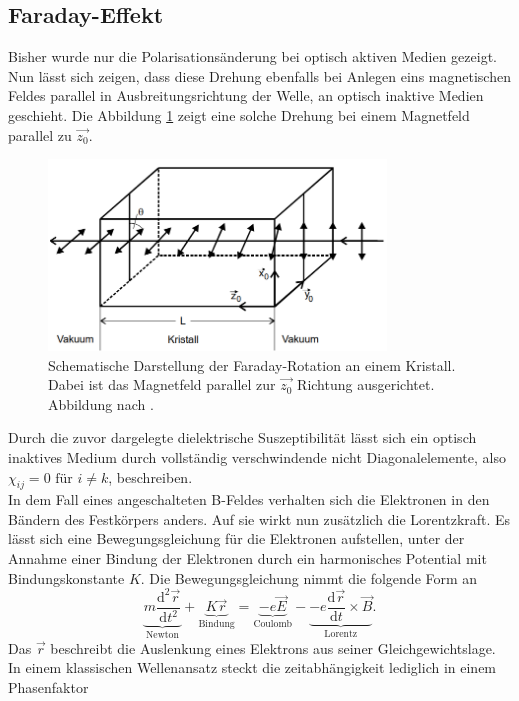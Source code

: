\subsection{Faraday-Effekt}
Bisher wurde nur die Polarisationsänderung bei optisch aktiven Medien gezeigt. Nun lässt sich zeigen, dass diese Drehung ebenfalls bei Anlegen eins magnetischen Feldes parallel in Ausbreitungsrichtung der Welle,
an optisch inaktive Medien geschieht. 
Die Abbildung \ref{fig:drehungitin} zeigt eine solche Drehung bei einem Magnetfeld parallel zu $\vec{z_0}$.
\begin{figure}
    \centering
    \includegraphics[width=0.8\textwidth]{bilder/drehung.png}    
    \caption{Schematische Darstellung der Faraday-Rotation an einem Kristall. Dabei ist das Magnetfeld parallel zur $\vec{z_0}$ Richtung ausgerichtet. 
    Abbildung nach \cite{skriptanhang}.}
    \label{fig:drehungitin}
\end{figure}
Durch die zuvor dargelegte dielektrische Suszeptibilität lässt sich ein optisch inaktives Medium durch vollständig verschwindende
nicht Diagonalelemente, also $\chi_{ij} = 0 \text{ für }i \neq k$, beschreiben.
\\
In dem Fall eines angeschalteten B-Feldes verhalten sich die Elektronen in den Bändern des Festkörpers anders. Auf sie wirkt nun zusätzlich die Lorentzkraft.
Es lässt sich eine Bewegungsgleichung für die Elektronen aufstellen, unter der Annahme einer Bindung der Elektronen durch ein harmonisches Potential mit Bindungskonstante
$K$. Die Bewegungsgleichung nimmt die folgende Form an 
\begin{equation}
\underbrace{m \frac{\text{d}^2\vec{r}}{\text{d}t^2}}_{\text{Newton}} + \underbrace{K\vec{r}}_{\text{Bindung}} = \underbrace{-e \vec{E}}_{\text{Coulomb}} - \underbrace{-e \frac{\text{d}\vec{r}}{\text{d}t} \times \vec{B}}_{\text{Lorentz}}.
\end{equation}
Das $\vec{r}$ beschreibt die Auslenkung eines Elektrons aus seiner Gleichgewichtslage. In einem klassischen Wellenansatz steckt die zeitabhängigkeit lediglich in einem Phasenfaktor
